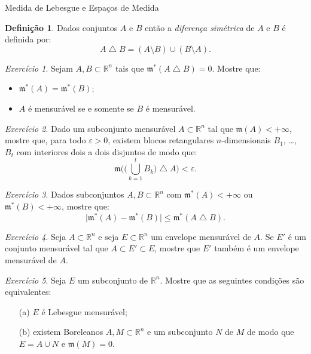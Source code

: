 \documentclass[oneside,final,11pt]{amsbook}
\newcommand{\R}{\mathds R}
\newcommand{\leb}{\mathfrak m}
\theoremstyle{remark}\newtheorem{exercise}{Exercício}[chapter]
\theoremstyle{remark}\newtheorem{*exercise}[exercise]{\hbox to 0pt{\hskip 0pt minus 1fil*}Exercício}
\theoremstyle{definition}\newtheorem{exdefin}{Definição}[chapter]
\theoremstyle{plain}\newtheorem{teo}{Teorema}[section]
\theoremstyle{plain}\newtheorem{lem}[teo]{Lema}
\theoremstyle{plain}\newtheorem{prop}[teo]{Proposição}
\theoremstyle{plain}\newtheorem{cor}[teo]{Corolário}
\theoremstyle{definition}\newtheorem{defin}[teo]{Definição}
\theoremstyle{remark}\newtheorem{rem}[teo]{Observação}
\theoremstyle{definition}\newtheorem{notation}[teo]{Notação}
\theoremstyle{definition}\newtheorem{convention}[teo]{Convenção}
\theoremstyle{definition}\newtheorem{example}[teo]{Exemplo}
\numberwithin{section}{chapter}
\numberwithin{equation}{section}
\begin{document}
\begin{chapter}{Medida de Lebesgue e Espaços de Medida}
\begin{exdefin}
Dados conjuntos $A$ e $B$ então a {\em diferença simétrica\/}
de $A$ e $B$ é definida por:
\[A\bigtriangleup B=(A\setminus B)\cup(B\setminus A).\]
\end{exdefin}

\begin{exercise}\label{exe:AtriangleBzero}
Sejam $A,B\subset\R^n$ tais que $\leb^*(A\bigtriangleup B)=0$. Mostre que:
\begin{itemize}
\item $\leb^*(A)=\leb^*(B)$;
\item $A$ é mensurável se e somente se $B$ é mensurável.
\end{itemize}
\end{exercise}

\begin{exercise}\label{exe:mensaproxblocos}
Dado um subconjunto mensurável $A\subset\R^n$ tal que $\leb(A)<+\infty$, mostre que,
para todo $\varepsilon>0$, existem blocos retangulares $n$-di\-men\-sio\-nais $B_1$, \dots, $B_t$ com
interiores dois a dois disjuntos de modo que:
\[\leb\Big(\big({\textstyle\bigcup_{k=1}^t B_k}\big)\bigtriangleup A\Big)<\varepsilon.\]
\end{exercise}

\begin{exercise}\label{exe:mstarweakcontr}
Dados subconjuntos $A,B\subset\R^n$ com $\leb^*(A)<+\infty$ ou $\leb^*(B)<+\infty$, mostre que:
\[\big\vert\leb^*(A)-\leb^*(B)\big\vert\le\leb^*(A\bigtriangleup B).\]
\end{exercise}

\begin{exercise}\label{exe:novoenvelope}
Seja $A\subset\R^n$ e seja $E\subset\R^n$ um envelope mensurável de $A$. Se $E'$ é um conjunto mensurável
tal que $A\subset E'\subset E$, mostre que $E'$ também é um envelope mensurável de $A$.
\end{exercise}

\begin{exercise}\label{exe:LebcomplBorel}
Seja $E$ um subconjunto de $\R^n$. Mostre que as seguintes condições são equivalentes:
\begin{itemize}
\item[(a)] $E$ é Lebesgue mensurável;
\item[(b)] existem Boreleanos $A,M\subset\R^n$ e um subconjunto $N$ de $M$ de modo que
$E=A\cup N$ e $\leb(M)=0$.
\end{itemize}
\end{exercise}


\end{chapter}
\end{document}
